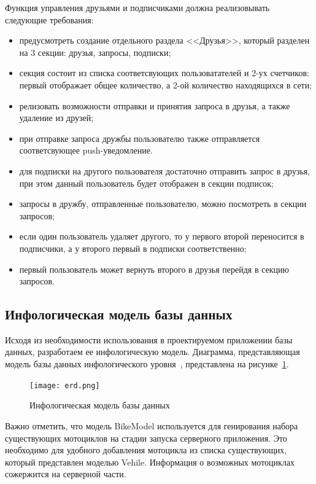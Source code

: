 Функция управления друзьями и подписчиками должна реализовывать следующие требования:
\begin{itemize}
	\item предусмотреть создание отдельного раздела <<Друзья>>, который разделен на 3 секции: друзья, запросы, подписки;
	\item секция состоит из списка соответсвующих пользоватателей и 2-ух счетчиков: первый отображает общее количество, а 2-ой количество находящихся в сети;
	\item релизовать возможности отправки и принятия запроса в друзья, а также удаление из друзей;
	\item при отправке запроса дружбы пользователю также отправляется соответсвующее push-уведомление.
	\item для подписки на другого пользователя достаточно отправить запрос в друзья, при этом данный пользователь будет отображен в секции подписок;
	\item запросы в дружбу, отправленные пользователю, можно посмотреть в секции запросов;
	\item если один пользователь удаляет другого, то у первого второй переносится в подписчики, а у второго первый в подписки соответственно;
	\item первый пользователь может вернуть второго в друзья перейдя в секцию запросов.
\end{itemize}

\subsection{Инфологическая модель базы данных}
\label{sec:domain:model:db}

Исходя из необходимости использования в проектируемом приложении базы данных, разработаем ее инфологическую модель. Диаграмма, представляющая модель базы данных инфологического уровня~\cite{kulikov_db_workbook}, представлена на рисунке~\ref{fig:domain:model:db:model}.

\begin{figure}[H]
\centering
	\texttt{[image: erd.png]}
	\caption{Инфологическая модель базы данных}
	\label{fig:domain:model:db:model}
\end{figure}

Важно отметить, что модель BikeModel используется для генирования набора существующих мотоциклов на стадии запуска серверного приложения. Это необходимо для удобного добавления мотоцикла из списка существующих, который представлен моделью Vehile. Информация о возможных мотоциклах сожержится на серверной части.

